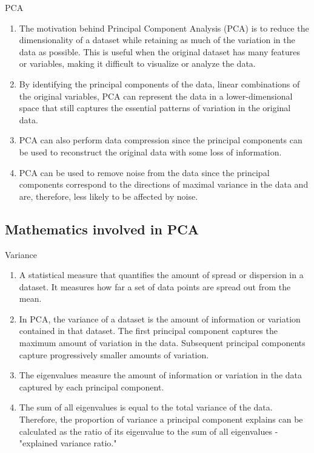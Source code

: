 \documentclass{beamer}
\begin{document}
\begin{frame}{PCA}
    \begin{enumerate}
        \item The motivation behind Principal Component Analysis (PCA) is to reduce the dimensionality of a dataset while retaining as much of the variation in the data as possible. This is useful when the original dataset has many features or variables, making it difficult to visualize or analyze the data.
        \item By identifying the principal components of the data, linear combinations of the original variables, PCA can represent the data in a lower-dimensional space that still captures the essential patterns of variation in the original data.
        \item PCA can also perform data compression since the principal components can be used to reconstruct the original data with some loss of information.
        \item PCA can be used to remove noise from the data since the principal components correspond to the directions of maximal variance in the data and are, therefore, less likely to be affected by noise.
    \end{enumerate}
\end{frame}

\subsection{Mathematics involved in PCA}
\begin{frame}{Variance}
    \begin{enumerate}
        \item A statistical measure that quantifies the amount of spread or dispersion in a dataset. It measures how far a set of data points are spread out from the mean.
        \item  In PCA, the variance of a dataset is the amount of information or variation contained in that dataset. The first principal component captures the maximum amount of variation in the data. Subsequent principal components capture progressively smaller amounts of variation.
        \item The eigenvalues measure the amount of information or variation in the data captured by each principal component.
        \item The sum of all eigenvalues is equal to the total variance of the data. Therefore, the proportion of variance a principal component explains can be calculated as the ratio of its eigenvalue to the sum of all eigenvalues - "explained variance ratio."

    \end{enumerate}
\end{frame}
\end{document}
